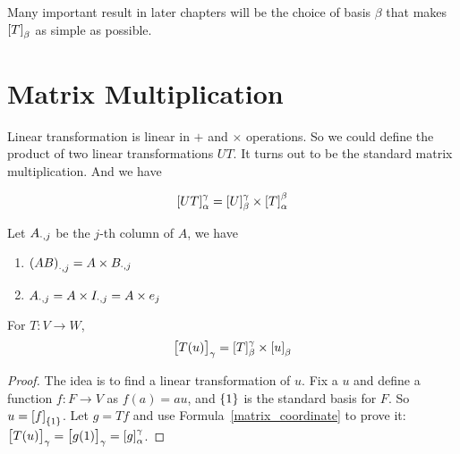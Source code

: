 Many important result in later chapters will be the choice of basis $\beta$ that makes $\coordinate{T}_\beta$ as simple as possible.

\section{Matrix Multiplication}

\begin{theorem}
    Linear transformation is linear in $+$ and $\times$ operations. So we could define the product of two linear transformations $UT$. It turns out to be the standard matrix multiplication. And we have

    \begin{equation}\label{matrix_coordinate}
        \coordinate{UT}_{\alpha}^{\gamma} = \coordinate{U}_{\beta}^{\gamma} \times \coordinate{T}_{\alpha}^{\beta}
    \end{equation}
\end{theorem}

\begin{theorem}
    Let ${A}_{\cdot, {j}}$ be the $j$-th column of $A$, we have
\begin{enumerate}
    \item ${(AB)}_{\cdot, {j}} = A \times {B}_{\cdot, {j}}$
    \item ${A}_{\cdot, {j}} = A \times {I}_{\cdot, {j}} = A \times e_j$
\end{enumerate}
\end{theorem}





\begin{theorem}
    For $T: V \rightarrow W$,
    \begin{equation}
        \coordinate{T(u)}_\gamma = \coordinate{T}_{\beta}^{\gamma} \times \coordinate{u}_{\beta}
    \end{equation}    
\end{theorem}
\begin{proof}
    The idea is to find a linear transformation of $u$. Fix a $u$ and define a function $f: F \rightarrow V$ as $f(a) = au$, and $\set{1}$ is the standard basis for $F$. So $u = \coordinate{f}_{\set{1}}$. Let $g=Tf$ and use Formula~\ref{matrix_coordinate} to prove it: $\coordinate{T(u)}_\gamma = \coordinate{g(1)}_\gamma = \coordinate{g}_{\alpha}^{\gamma}$.
\end{proof}

